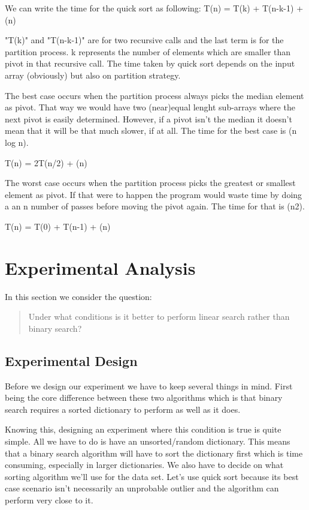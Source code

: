 \documentclass{article}
\begin{document}
We can write the time for the quick sort as following:
T(n) = T(k) + T(n-k-1) + \theta(n)

"T(k)" and "T(n-k-1)" are for two recursive calls and the last term is for the partition process. k represents the number of elements which are smaller than pivot in that recursive call. The time taken by quick sort depends on the input array (obviously) but also on partition strategy.

The best case occurs when the partition process always picks the median element as pivot. That way we would have two (near)equal lenght sub-arrays where the next pivot is easily determined. However, if a pivot isn't the median it doesn't mean that it will be that much slower, if at all. The time for the best case is \theta(n log n).

T(n) = 2T(n/2) + \theta(n)

The worst case occurs when the partition process picks the greatest or smallest element as pivot. If that were to happen the program would waste time by doing a an n number of passes before moving the pivot again. The time for that is \theta(n2).

T(n) = T(0) + T(n-1) + \theta(n)

\section{Experimental Analysis}
\label{sec:initialExperiments}

In this section we consider the question:
	\begin{quote}
	Under what conditions is it better to perform linear search rather than binary search?
	\end{quote}

\subsection{Experimental Design}

Before we design our experiment we have to keep several things in mind. First being the core difference between these two algorithms which is that binary search requires a sorted dictionary to perform as well as it does.

Knowing this, designing an experiment where this condition is true is quite simple. All we have to do is have an unsorted/random dictionary. This means that a binary search algorithm will have to sort the dictionary first which is time consuming, especially in larger dictionaries. We also have to decide on what sorting algorithm we'll use for the data set. Let's use quick sort because its best case scenario isn't necessarily an unprobable outlier and the algorithm can perform very close to it.
\end{document}
